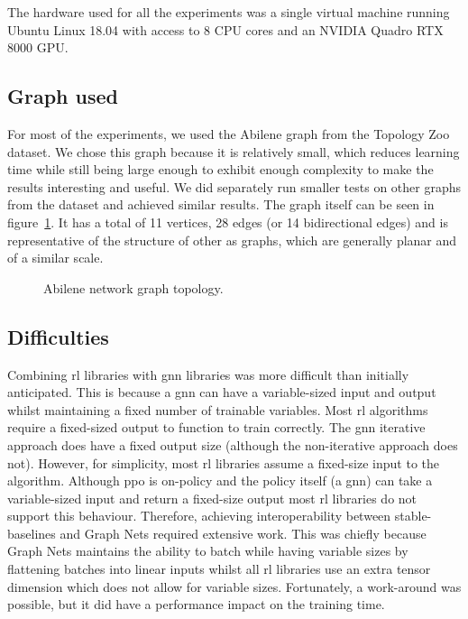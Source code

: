 The hardware used for all the experiments was a single virtual machine running Ubuntu Linux 18.04 with access to 8 CPU cores and an NVIDIA Quadro RTX 8000 GPU.

\subsection{Graph used}

For most of the experiments, we used the Abilene graph from the Topology Zoo dataset. We chose this graph because it is relatively small, which reduces learning time while still being large enough to exhibit enough complexity to make the results interesting and useful. We did separately run smaller tests on other graphs from the dataset and achieved similar results. The graph itself can be seen in figure~\ref{fig:abilene}. It has a total of 11 vertices, 28 edges (or 14 bidirectional edges) and is representative of the structure of other \ac{as} graphs, which are generally planar and of a similar scale.

\begin{figure}
    \centering
    \resizebox{\textwidth}{!}{}
    \caption{Abilene network graph topology.}
    \label{fig:abilene}
\end{figure}


\subsection{Difficulties}
Combining \ac{rl} libraries with \ac{gnn} libraries was more difficult than initially anticipated. This is because a \ac{gnn} can have a variable-sized input and output whilst maintaining a fixed number of trainable variables. Most \ac{rl} algorithms require a fixed-sized output to function to train correctly. The \ac{gnn} iterative approach does have a fixed output size (although the non-iterative approach does not). However, for simplicity, most \ac{rl} libraries assume a fixed-size input to the algorithm. Although \ac{ppo} is on-policy and the policy itself (a \ac{gnn}) can take a variable-sized input and return a fixed-size output most \ac{rl} libraries do not support this behaviour. Therefore, achieving interoperability between stable-baselines and Graph Nets required extensive work. This was chiefly because Graph Nets maintains the ability to batch while having variable sizes by flattening batches into linear inputs whilst all \ac{rl} libraries use an extra tensor dimension which does not allow for variable sizes. Fortunately, a work-around was possible, but it did have a performance impact on the training time.


